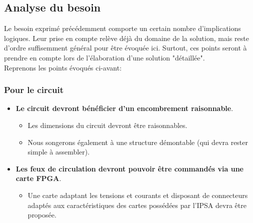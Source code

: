 \subsection{Analyse du besoin}

Le besoin exprimé précédemment comporte un certain nombre d'implications logiques.
Leur prise en compte relève déjà du domaine de la solution, mais reste d'ordre suffisemment général pour être évoquée ici. Surtout, ces points seront à prendre en compte lors de l'élaboration d'une solution "détaillée".\\

Reprenons les points évoqués ci-avant:

\renewcommand{\labelitemi}{\textbullet}
\renewcommand{\labelitemii}{$\Rightarrow$}
\renewcommand{\labelitemiii}{-}
\renewcommand{\labelitemiv}{\textbullet}

	\subsubsection{Pour le circuit}
		\begin{itemize}
			\item \textbf{Le circuit devront bénéficier d'un encombrement raisonnable}.
			\begin{itemize}
				\item Les dimensions du circuit devront être raisonnables.
				\item Nous songerons également à une structure démontable (qui devra rester simple à assembler).
			\end{itemize}
			\item \textbf{Les feux de circulation devront pouvoir être commandés via une carte FPGA}.
			\begin{itemize}
				\item Une carte adaptant les tensions et courants et disposant de connecteurs adaptés aux caractéristiques des cartes possédées par l'IPSA devra être proposée.
			\end{itemize}
		\end{itemize}
